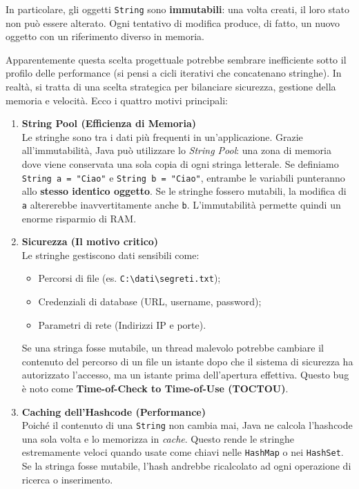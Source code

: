 In particolare, gli oggetti \texttt{String} sono \textbf{immutabili}: una volta creati, il loro stato non può essere alterato. Ogni tentativo di modifica produce, di fatto, un nuovo oggetto con un riferimento diverso in memoria.

Apparentemente questa scelta progettuale potrebbe sembrare inefficiente sotto il profilo delle performance (si pensi a cicli iterativi che concatenano stringhe). In realtà, si tratta di una scelta strategica per bilanciare sicurezza, gestione della memoria e velocità. Ecco i quattro motivi principali:

\begin{enumerate}
    \item \textbf{String Pool (Efficienza di Memoria)} \\
    Le stringhe sono tra i dati più frequenti in un'applicazione. Grazie all'immutabilità, Java può utilizzare lo \textit{String Pool}: una zona di memoria dove viene conservata una sola copia di ogni stringa letterale.
    Se definiamo \texttt{String a = "Ciao"} e \texttt{String b = "Ciao"}, entrambe le variabili punteranno allo \textbf{stesso identico oggetto}. Se le stringhe fossero mutabili, la modifica di \texttt{a} altererebbe inavvertitamente anche \texttt{b}. L'immutabilità permette quindi un enorme risparmio di RAM.

    \item \textbf{Sicurezza (Il motivo critico)} \\
    Le stringhe gestiscono dati sensibili come:
    \begin{itemize}
        \item Percorsi di file (es. \texttt{C:\textbackslash dati\textbackslash segreti.txt});
        \item Credenziali di database (URL, username, password);
        \item Parametri di rete (Indirizzi IP e porte).
    \end{itemize}
    Se una stringa fosse mutabile, un thread malevolo potrebbe cambiare il contenuto del percorso di un file un istante dopo che il sistema di sicurezza ha autorizzato l'accesso, ma un istante prima dell'apertura effettiva. Questo bug è noto come \textbf{Time-of-Check to Time-of-Use (TOCTOU)}.

    \item \textbf{Caching dell'Hashcode (Performance)} \\
    Poiché il contenuto di una \texttt{String} non cambia mai, Java ne calcola l'hashcode una sola volta e lo memorizza in \textit{cache}. Questo rende le stringhe estremamente veloci quando usate come chiavi nelle \texttt{HashMap} o nei \texttt{HashSet}. Se la stringa fosse mutabile, l'hash andrebbe ricalcolato ad ogni operazione di ricerca o inserimento.


\end{enumerate}
